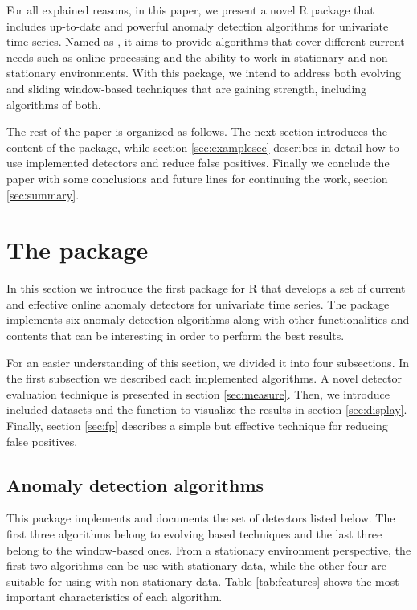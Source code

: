 \documentclass[a4paper]{article}\usepackage[]{graphicx}\usepackage[]{color}
\begin{document}
For all explained reasons, in this paper, we present a novel R package that includes up-to-date and powerful anomaly detection algorithms for univariate time series. Named as , it aims to provide algorithms that cover different current needs such as online processing and the ability to work in stationary and non-stationary environments. With this package, we intend to address both evolving and sliding window-based techniques that are gaining strength, including algorithms of both.

The rest of the paper is organized as follows. The next section introduces the content of the  package, while section \ref{sec:examplesec} describes in detail how to use implemented detectors and reduce false positives. Finally we conclude the paper with some conclusions and future lines for continuing the work, section \ref{sec:summary}.

\section{The  package}\label{sec:package}

In this section we introduce the first package for R that develops a set of current and effective online anomaly detectors for univariate time series. The  package implements six anomaly detection algorithms along with other functionalities and contents that can be interesting in order to perform the best results.

For an easier understanding of this section, we divided it into four subsections. In the first subsection we described each implemented algorithms. A novel detector evaluation technique is presented in section \ref{sec:measure}. Then, we introduce included datasets and the function to visualize the results in section \ref{sec:display}. Finally, section \ref{sec:fp} describes a simple but effective technique for reducing false positives.

\subsection{Anomaly detection algorithms} \label{sec:detectors}

This package implements and documents the set of detectors listed below. The first three algorithms belong to evolving based techniques and the last three belong to the window-based ones. From a stationary environment perspective, the first two algorithms can be use with stationary data, while the other four are suitable for using with non-stationary data. Table \ref{tab:features} shows the most important characteristics of each algorithm.
\end{document}

